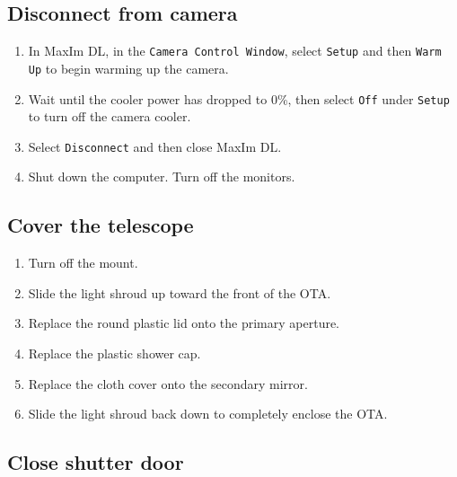\documentclass{article}
\begin{document}
	\subsection{Disconnect from camera}
		
		\begin{enumerate}
			
			\item In MaxIm DL, in the \texttt{Camera Control Window}, select \texttt{Setup} and then \texttt{Warm Up} to begin warming up the camera.
			
			\item Wait until the cooler power has dropped to 0\%, then select \texttt{Off} under \texttt{Setup} to turn off the camera cooler.
			
			\item Select \texttt{Disconnect} and then close MaxIm DL.
			
			\item Shut down the computer. Turn off the monitors.
			
		\end{enumerate}
		
	\subsection{Cover the telescope}
		
		\begin{enumerate}
			
			\item Turn off the mount.
			
			\item Slide the light shroud up toward the front of the OTA.
			
			\item Replace the round plastic lid onto the primary aperture.
			
			\item Replace the plastic shower cap.
			
			\item Replace the cloth cover onto the secondary mirror.
			
			\item Slide the light shroud back down to completely enclose the OTA.
			
		\end{enumerate}
		
	\subsection{Close shutter door}
		
\end{document}

